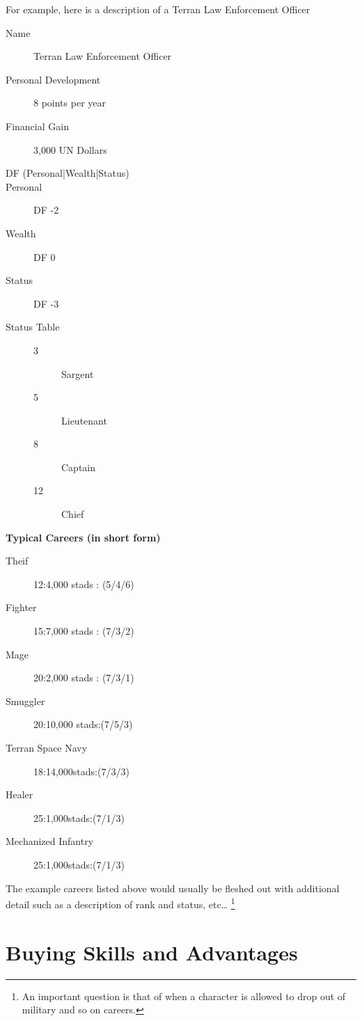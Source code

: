 For example, here is a description of a Terran Law Enforcement Officer

\begin{description}
	\item [Name]
	Terran Law Enforcement Officer
    \item[Personal Development]
	8 points per year
	\item[Financial Gain]
    3,000 UN Dollars
    \item[DF (Personal|Wealth|Status)]
        \item[Personal]
		DF -2 
        \item[Wealth]
        DF 0 
        \item[Status]
        DF -3
    \item[Status Table]
    \begin{description}
        \item[3] Sargent
        \item[5] Lieutenant
        \item[8] Captain
        \item[12] Chief
    \end{description}
\end{description}

{\bf Typical Careers (in short form)}
	\begin{description}
		\item[Theif]
		        12:4,000 stads : (5/4/6)
		\item[Fighter]
		        15:7,000 stads : (7/3/2)
		\item[Mage]
		        20:2,000 stads : (7/3/1)
		\item[Smuggler]
		       20:10,000 stads:(7/5/3)
		\item[Terran Space Navy]
		       18:14,000stads:(7/3/3)
		\item[Healer]
		       25:1,000stads:(7/1/3)
		\item[Mechanized Infantry]
		       25:1,000stads:(7/1/3)
	\end{description}

The example careers listed above would usually be fleshed out with
additional detail such as a description of rank and status, etc\dots
\footnote{An important question is that of when a character is
allowed to drop out of military and so on careers.}

\section{Buying Skills and Advantages}

